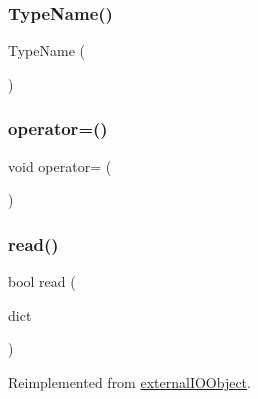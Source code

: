 \subsubsection{\texorpdfstring{Type\+Name()}{TypeName()}}
{\footnotesize\ttfamily Type\+Name (\begin{DoxyParamCaption}\item[{\char`\"{}ext\+Patch\char`\"{}}]{ }\end{DoxyParamCaption})}

\mbox{\label{classFoam_1_1externalIOObject_1_1extPatch_af403f747869c36d2e6d794ffbfbd6007}} 
\subsubsection{\texorpdfstring{operator=()}{operator=()}}
{\footnotesize\ttfamily void operator= (\begin{DoxyParamCaption}\item[{const \hyperlink{classFoam_1_1externalIOObject_1_1extPatch}{ext\+Patch} \&}]{ }\end{DoxyParamCaption})\hspace{0.3cm}{\ttfamily [delete]}}

\mbox{\label{classFoam_1_1externalIOObject_1_1extPatch_afac0600fef97b05534a595ce00b272ed}} 
\subsubsection{\texorpdfstring{read()}{read()}}
{\footnotesize\ttfamily bool read (\begin{DoxyParamCaption}\item[{const dictionary \&}]{dict }\end{DoxyParamCaption})\hspace{0.3cm}{\ttfamily [virtual]}}



Reimplemented from \hyperlink{classFoam_1_1externalIOObject_1_1externalIOObject_a6ce0c64db98eb6144d363dbfc86104eb}{external\+I\+O\+Object}.




